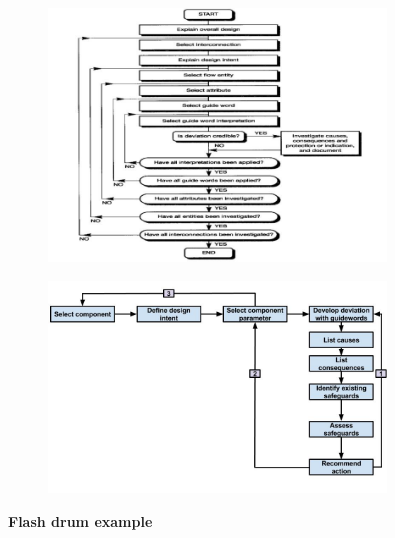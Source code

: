 \documentclass[aspectratio=1610,pdftex,dvipsnames,compress,xcolor={dvipsnames}]{beamer}
\begin{document}
\addtocounter{framenumber}{-1}
\begin{frame}{}
    \begin{figure}
        \centering
        \includegraphics[width=0.80\textwidth]{hazop_flowchart.jpg}
    \end{figure}
\end{frame}


\begin{frame}{}
    \begin{figure}
        \centering
        \includegraphics[width=0.80\textwidth]{hazop.loop.jpg}
    \end{figure}
\end{frame}


\begin{frame}[plain]{}
    \centering\LARGE\textbf{Flash drum example}
\end{frame}
\end{document}
